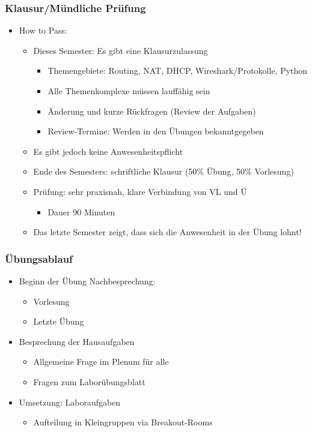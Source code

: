 \documentclass[xcolor=dvipsnames,aspectratio=169]{beamer}
\begin{document}
\begin{frame}
	\frametitle{Klausur/Mündliche Prüfung}
	\begin{itemize}
		\item How to Pass:
		\begin{itemize}
			\item Dieses Semester: Es gibt eine Klausurzulassung
			\begin{itemize}
				\item Themengebiete: Routing, NAT, DHCP, Wireshark/Protokolle, Python
				\item Alle Themenkomplexe müssen lauffähig sein
				\item Änderung und kurze Rückfragen (Review der Aufgaben)
				\item Review-Termine: Werden in den Übungen bekanntgegeben
			\end{itemize}
			\item Es gibt jedoch keine Anwesenheitspflicht
			\item Ende des Semesters: schriftliche Klausur (50\% Übung, 50\% Vorlesung)
			\item Prüfung: sehr praxisnah, klare Verbindung von VL und Ü
			\begin{itemize}
				\item Dauer 90 Minuten
			\end{itemize}
			\item Das letzte Semester zeigt, dass sich die Anwesenheit in der Übung lohnt!
		\end{itemize}
	\end{itemize}
\end{frame}

\begin{frame}
	\frametitle{Übungsablauf}
	\begin{itemize}
		\item Beginn der Übung Nachbesprechung:
		\begin{itemize}
			\item Vorlesung
			\item Letzte Übung
		\end{itemize}
		\item Besprechung der Hausaufgaben
		\begin{itemize}
			\item Allgemeine Frage im Plenum für alle
			\item Fragen zum Laborübungsblatt
		\end{itemize}
		\item Umsetzung: Laboraufgaben
		\begin{itemize}
			\item Aufteilung in Kleingruppen via Breakout-Rooms
		\end{itemize}
	\end{itemize}
\end{frame}
\end{document}
